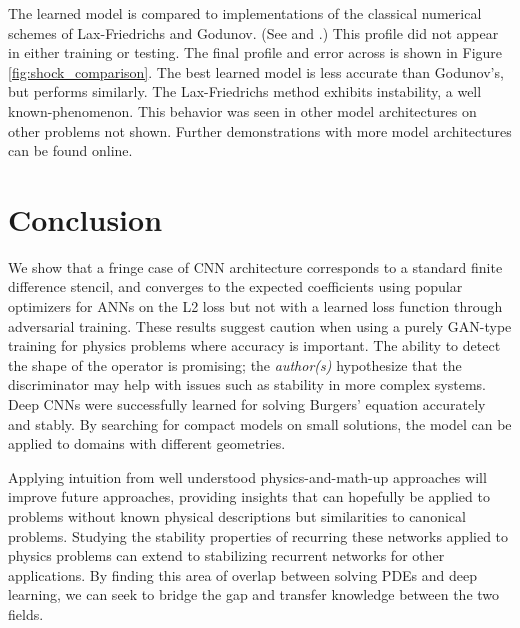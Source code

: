 \documentclass{article}
\begin{document}
The learned model is compared to implementations of the classical
numerical schemes of Lax-Friedrichs and Godunov. (See
\citet{leveque_finite_2007} and  \citet{godunov_difference_1959}.) This
profile did not appear in either training or testing. The final
profile and error across is shown in Figure
\ref{fig:shock_comparison}. 
The best learned model is less accurate than Godunov's, but performs
similarly. The Lax-Friedrichs method exhibits instability, a well
known-phenomenon. This behavior was seen in other model
architectures on other problems not shown. Further demonstrations with more model
architectures can be found online.

\section{Conclusion}
\label{sec:conclusion}

We show that a fringe case of CNN architecture corresponds to a
standard finite difference stencil, and converges to the expected
coefficients using popular optimizers for ANNs on the L2 loss but not with a
learned loss function through adversarial training.
These results suggest caution when using a purely GAN-type training for physics problems where accuracy is important. The ability to detect the shape of the operator is promising; the {\em author(s)} hypothesize that the discriminator may help with issues such as stability in more complex systems.
Deep CNNs were successfully learned for solving Burgers' equation accurately and stably.
By searching for compact models on small solutions, the model can be applied to domains
with different geometries.




Applying intuition from well understood physics-and-math-up approaches
will improve future approaches, providing insights that can hopefully
be applied to problems without known physical descriptions but
similarities to canonical problems. Studying the stability properties of recurring these networks applied
to physics problems can extend to stabilizing recurrent networks for
other applications.
By finding this area of overlap between solving PDEs and deep
learning, we can seek to bridge the gap and transfer knowledge between
the two fields.
\end{document}
